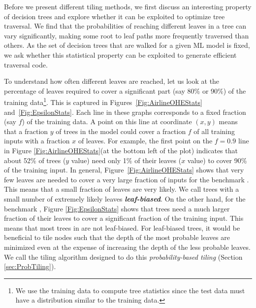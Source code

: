 Before we present different tiling methods, we first discuss an interesting property of decision trees and 
explore whether it can be exploited to optimize tree traversal. We find that the probabilities of reaching different leaves
in a tree can vary significantly, making some root to leaf paths more frequently traversed than others. As the set of 
decision trees that are walked for a given ML model is fixed, we ask whether this statistical property can be 
exploited to generate efficient traversal code.%

To understand how often different leaves are reached, let us look at the percentage of leaves required to 
cover a significant part (say 80\% or 90\%) of the training data\footnote{We use the training data to compute tree statistics 
since the test data must have a distribution similar to the training data.}.
This is captured in Figures~\ref{Fig:AirlineOHEStats} and~\ref{Fig:EpsilonStats}.
Each line in these graphs corresponds to a fixed fraction  (say $f$) of the training data. 
A point on this line at coordinate $(x, y)$ means that a fraction $y$ of trees in the model could cover a
fraction $f$ of all training inputs with a fraction $x$ of leaves. For example, the first point on the
$f=0.9$ line in Figure \ref{Fig:AirlineOHEStats}(at the bottom left of the plot) indicates that about 52\% of trees ($y$ value) need only 1\% of their
leaves ($x$ value) to cover 90\% of the training input. 
In general, Figure~\ref{Fig:AirlineOHEStats} shows that very few leaves are needed to cover a very large fraction 
of inputs for the benchmark . This means that a small fraction of leaves are very likely. 
We call trees with a small number of extremely likely leaves \textbf{\emph{leaf-biased}}.
On the other hand, for the benchmark ,
Figure \ref{Fig:EpsilonStats} shows that trees need a much larger fraction of their leaves to cover a significant fraction of the training input.
This means that most trees in  are not leaf-biased. For leaf-biased trees, it would be beneficial to tile nodes such that the
depth of the most probable leaves are minimized even at the expense of 
increasing the depth of the less probable leaves. We call the tiling algorithm 
designed to do this \emph{probability-based tiling} (Section \ref{sec:ProbTiling}). 


